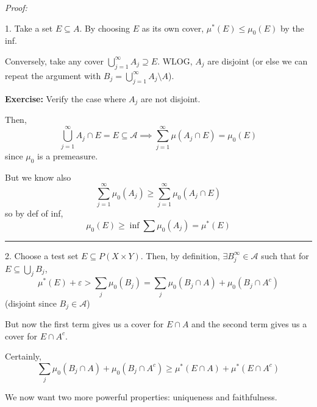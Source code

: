 \documentclass[12pt]{report}
\newcommand{\ep}{\varepsilon}
\newcommand{\A}{\mathcal{A}}
\newcommand{\sub}{\subseteq}
\renewcommand{\div}{\vspace*{10pt}\hrule\vspace*{10pt}}
\newenvironment*{tbox}[2][gray]{
    \begin{tcolorbox}[
        parbox=false,
        colback=#1!5!white,
        colframe=#1!75!black,
        breakable,
        title={#2}
    ]}
    {\end{tcolorbox}}
\newenvironment*{exercise}[1][red]{
    \begin{tcolorbox}[
        parbox=false,
        colback=#1!5!white,
        colframe=#1!75!black,
        breakable
    ]}
    {\end{tcolorbox}}
\begin{document}
    \begin{tbox}{\textbf{Proposition:} If $\mu_0$ is a premeasure on $\A$, then for $\mu^*$ defined by
    \[\mu^*(E) = \inf_{\bigcup_i A \supseteq E} \sum_{j=1}^\infty \mu_0(A_j)\]
    \begin{enumerate}
        \item $\mu^*\big|_{\A} = \mu_0$
        \item $\A$ is $\mu^*$-measurable
    \end{enumerate}}
    
        \emph{Proof:} 

        1. Take a set $E \sub A$. By choosing $E$ as its own cover, $\mu^*(E) \leq \mu_0(E)$ by the inf. 

        Conversely, take any cover $\bigcup_{j=1}^\infty A_j \supseteq E$. WLOG, $A_j$ are disjoint (or else we can repeat the argument with $B_j = \bigcup_{j=1}^\infty A_j \setminus A$). 

        \begin{exercise}
            \textbf{Exercise:} Verify the case where $A_j$ are not disjoint.
        \end{exercise}

        Then,
        \[\bigcup_{j=1}^\infty A_j \cap E = E \sub \A \implies \sum_{j=1}^\infty \mu(A_j \cap E) = \mu_0(E)\]
        since $\mu_0$ is a premeasure.

        But we know also 
        \[\sum_{j=1}^\infty \mu_0(A_j) \geq \sum_{j=1}^\infty \mu_0(A_j \cap E)\]
        so by def of inf, 
        \[\mu_0(E) \geq \inf \sum \mu_0(A_j) = \mu^*(E)\]

        \div 

        2. Choose a test set $E \sub P(X \times Y)$. Then, by definition, $\exists B_j^{\infty} \in \A$ such that for $E \sub \bigcup_j B_j$,
        \[\mu^*(E) + \ep > \sum_j \mu_0(B_j) = \sum_j \mu_0(B_j \cap A) + \mu_0(B_j \cap A^c)\]
        (disjoint since $B_j \in \A$)

        But now the first term gives us a cover for $E \cap A$ and the second term gives us a cover for $E \cap A^c$.

        Certainly,
        \[\sum_j \mu_0(B_j \cap A) + \mu_0(B_j \cap A^c) \geq \mu^*(E \cap A) + \mu^*(E \cap A^c)\]
        
    \end{tbox}

    We now want two more powerful properties: uniqueness and faithfulness. 
\end{document}
